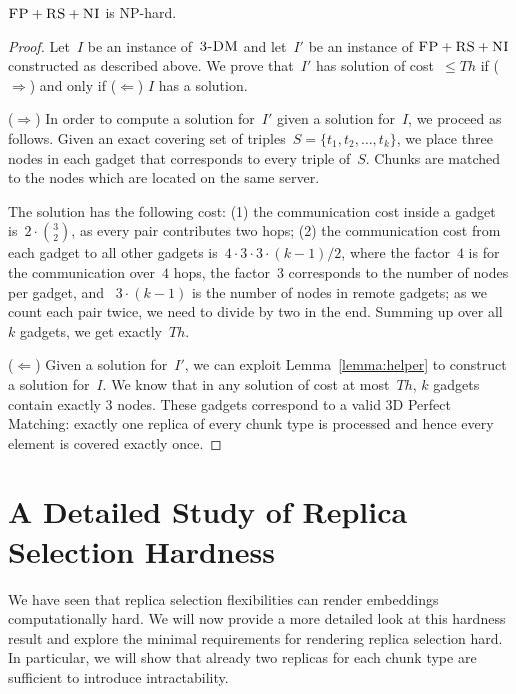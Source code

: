 \documentclass[preprint,12pt]{elsarticle}
\newcommand{\CC}{\textsc{NI}}
\newcommand{\FP}{\textsc{FP}}
\newcommand{\RS}{\textsc{RS}}
\newcommand{\TDM}{\textsc{3-DM}}
\newcommand{\Thr}{\ensuremath{Th}}
\begin{document}
\begin{theorem}
\label{theorem:fp_rs_cc}
$\FP+\RS+\CC$ is NP-hard.
\end{theorem}
\begin{proof}
Let~$I$ be an instance of~$\TDM$ and let~$I'$ be an instance of
$\FP+\RS+\CC$ constructed as described above.
We prove that~$I'$ has solution of cost~$\leq \Thr$ if ($\Rightarrow$) and only if
($\Leftarrow$)
$I$ has a solution.

($\Rightarrow$) In order to compute a solution
for~$I'$ given a solution for~$I$, we proceed as follows.
Given an exact covering set of triples~$S = \{t_1, t_2,
\ldots, t_k\}$, we place three nodes in each gadget that
corresponds to every triple of~$S$. Chunks are matched to the nodes which are located
on the same server.

The solution has the following cost:
(1) the communication cost inside a gadget is~$2 \cdot {3 \choose 2}$,
  as every pair contributes two hops;
  (2) the communication cost from each gadget to all other gadgets is~$4
  \cdot 3 \cdot 3 \cdot (k - 1) / 2$, where the factor~$4$ is
  for the
  communication over~$4$ hops, the factor~$3$
  corresponds to the number of nodes per gadget, and
 ~$3 \cdot (k-1)$ is the number of nodes in remote gadgets;
  as we count each pair twice, we need to divide by two in the end.
Summing up over all~$k$ gadgets, we get exactly~$\Thr$.

($\Leftarrow$) Given a solution for~$I'$,
we can exploit Lemma~\ref{lemma:helper} to construct a solution for~$I$.
We know that in any solution of cost at most~$\Thr$,
$k$ gadgets contain exactly 3 nodes. These gadgets correspond to a valid
3D Perfect Matching: exactly one replica of every chunk type is processed and
hence every element is covered exactly once.
\end{proof}



\section{A Detailed Study of Replica Selection Hardness}\label{ap:tworep}

We have seen that replica selection flexibilities can render embeddings computationally hard.
We will now provide a more detailed look at this hardness result
and explore the minimal requirements for rendering replica selection hard.
In particular, we will show that already two replicas for each chunk type are sufficient to
introduce intractability.
\end{document}
